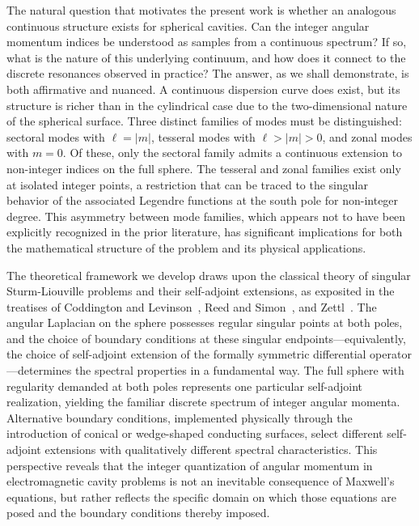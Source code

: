 \documentclass[
  aip,
  amsmath,amssymb,
  preprint
]{revtex4-1}
\begin{document}
The natural question that motivates the present work is whether an analogous continuous structure exists for spherical cavities. Can the integer angular momentum indices be understood as samples from a continuous spectrum? If so, what is the nature of this underlying continuum, and how does it connect to the discrete resonances observed in practice? The answer, as we shall demonstrate, is both affirmative and nuanced. A continuous dispersion curve does exist, but its structure is richer than in the cylindrical case due to the two-dimensional nature of the spherical surface. Three distinct families of modes must be distinguished: sectoral modes with $\ell = |m|$, tesseral modes with $\ell > |m| > 0$, and zonal modes with $m = 0$. Of these, only the sectoral family admits a continuous extension to non-integer indices on the full sphere. The tesseral and zonal families exist only at isolated integer points, a restriction that can be traced to the singular behavior of the associated Legendre functions at the south pole for non-integer degree. This asymmetry between mode families, which appears not to have been explicitly recognized in the prior literature, has significant implications for both the mathematical structure of the problem and its physical applications.

The theoretical framework we develop draws upon the classical theory of singular Sturm-Liouville problems and their self-adjoint extensions, as exposited in the treatises of Coddington and Levinson~\cite{CoddingtonLevinson1955}, Reed and Simon~\cite{ReedSimon1975}, and Zettl~\cite{Zettl2005}. The angular Laplacian on the sphere possesses regular singular points at both poles, and the choice of boundary conditions at these singular endpoints---equivalently, the choice of self-adjoint extension of the formally symmetric differential operator---determines the spectral properties in a fundamental way. The full sphere with regularity demanded at both poles represents one particular self-adjoint realization, yielding the familiar discrete spectrum of integer angular momenta. Alternative boundary conditions, implemented physically through the introduction of conical or wedge-shaped conducting surfaces, select different self-adjoint extensions with qualitatively different spectral characteristics. This perspective reveals that the integer quantization of angular momentum in electromagnetic cavity problems is not an inevitable consequence of Maxwell's equations, but rather reflects the specific domain on which those equations are posed and the boundary conditions thereby imposed.
\end{document}
